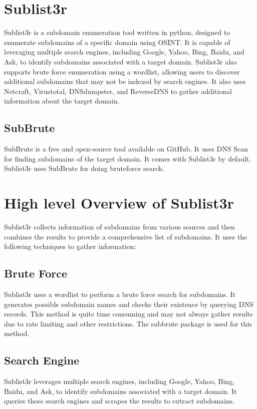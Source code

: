 \documentclass[12pt]{article}
\begin{document}
\section{Sublist3r}\label{sec:sublist3r}
Sublist3r is a subdomain enumeration tool written in python, designed to enumerate subdomains of a specific domain using OSINT. It is capable of leveraging multiple search engines, including Google, Yahoo, Bing, Baidu, and Ask, to identify subdomains associated with a target domain. Sublist3r also supports brute force enumeration using a wordlist, allowing users to discover additional subdomains that may not be indexed by search engines. It also uses Netcraft, Virustotal, DNSdumpster, and ReverseDNS to gather additional information about the target domain.

\subsection{SubBrute}\label{subsec:subbrute}
SubBrute is a free and open-source tool available on GitHub. It uses DNS Scan for finding subdomains of the target domain. It comes with Sublist3r by default. Sublist3r uses SubBrute for doing bruteforce search.

\section{High level Overview of Sublist3r}\label{sec:high-level-overview}
Sublist3r collects information of subdomains from various sources and then combines the results to provide a comprehensive list of subdomains. It uses the following techniques to gather information:

\subsection{Brute Force}\label{subsec:brute-force}
Sublist3r uses a wordlist to perform a brute force search for subdomains. It generates possible subdomain names and checks their existence by querying DNS records. This method is quite time consuming and may not always gather results due to rate limiting and other restrictions. The subbrute package is used for this method.

\subsection{Search Engine}\label{subsec:search-engine}
Sublist3r leverages multiple search engines, including Google, Yahoo, Bing, Baidu, and Ask, to identify subdomains associated with a target domain. It queries these search engines and scrapes the results to extract subdomains.
\end{document}

